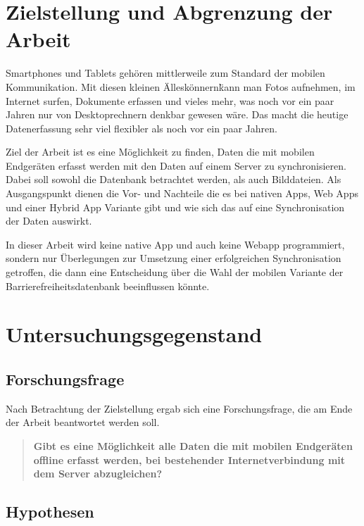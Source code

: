 \section{Zielstellung und Abgrenzung der Arbeit}
\label{sec:goal:goal}

Smartphones und Tablets gehören mittlerweile zum Standard der mobilen Kommunikation. Mit diesen kleinen \"Alleskönnern\" kann man Fotos aufnehmen, im Internet surfen, Dokumente erfassen und vieles mehr, was noch vor ein paar Jahren nur von Desktoprechnern denkbar gewesen wäre. Das macht die heutige Datenerfassung sehr viel flexibler als noch vor ein paar Jahren.

Ziel der Arbeit ist es eine Möglichkeit zu finden, Daten die mit mobilen Endgeräten erfasst werden mit den Daten auf einem Server zu synchronisieren.  Dabei soll sowohl die Datenbank betrachtet werden, als auch Bilddateien. Als Ausgangspunkt dienen die Vor- und Nachteile die es bei nativen Apps, Web Apps und einer Hybrid App Variante gibt und wie sich das auf eine Synchronisation der Daten auswirkt.

In dieser Arbeit wird keine native App und auch keine Webapp programmiert, sondern nur Überlegungen zur Umsetzung einer erfolgreichen Synchronisation getroffen, die dann eine Entscheidung über die Wahl der mobilen Variante der Barrierefreiheitsdatenbank beeinflussen könnte.

\section{Untersuchungsgegenstand}
\label{sec:investigation:inv}

\subsection{Forschungsfrage}
\label{subsec:problem:prob}

Nach Betrachtung der Zielstellung ergab sich eine Forschungsfrage, die am Ende der Arbeit beantwortet werden soll.

\begin{quote}
	\textbf {Gibt es eine Möglichkeit alle Daten die mit mobilen Endgeräten offline erfasst werden, bei bestehender Internetverbindung mit dem Server abzugleichen?}
\end{quote}

\subsection{Hypothesen}
\label{subsec:hypothesis:hypo}

